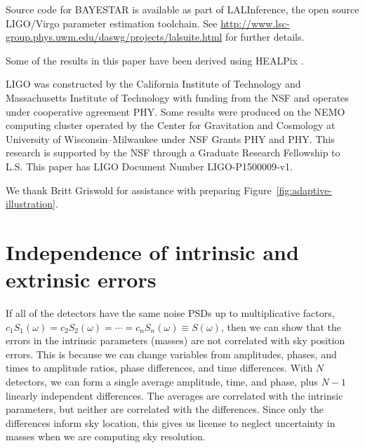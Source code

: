 \documentclass[amsmath,amssymb,aps,prx,reprint,nopreprintnumbers,nofootinbib]{revtex4-1}
\begin{document}


\begin{acknowledgements}
Source code for \ac{BAYESTAR} is available as part of LALInference, the open source LIGO/Virgo parameter estimation toolchain. See \url{http://www.lsc-group.phys.uwm.edu/daswg/projects/lalsuite.html} for further details.

Some of the results in this paper have been derived using \ac{HEALPix} \cite{healpix}.

LIGO was constructed by the California Institute of Technology and Massachusetts Institute of Technology with funding from the \ac{NSF} and operates under cooperative agreement PHY. Some results were produced on the NEMO computing cluster operated by the Center for Gravitation and Cosmology at University of Wisconsin\nobreakdashes--Milwaukee under \ac{NSF} Grants PHY and PHY. This research is supported by the \ac{NSF} through a Graduate Research Fellowship to L.S. This paper has LIGO Document Number LIGO\nobreakdashes-P1500009\nobreakdashes-v1.

We thank Britt Griswold for assistance with preparing Figure~\ref{fig:adaptive-illustration}.
\end{acknowledgements}

\appendix

\section{Independence of intrinsic and extrinsic errors}
\label{sec:independence-intrinsic-extrinsic}

If all of the detectors have the same noise \acp{PSD} up to multiplicative factors, $c_1 S_1(\omega) = c_2 S_2(\omega) = \cdots = c_n S_n(\omega) \equiv S(\omega)$, then we can show that the errors in the intrinsic parameters (masses) are not correlated with sky position errors. This is because we can change variables from amplitudes, phases, and times to amplitude ratios, phase differences, and time differences. With $N$ detectors, we can form a single average amplitude, time, and phase, plus $N-1$ linearly independent differences. The averages are correlated with the intrinsic parameters, but neither are correlated with the differences. Since only the differences inform sky location, this gives us license to neglect uncertainty in masses when we are computing sky resolution.
\end{document}
